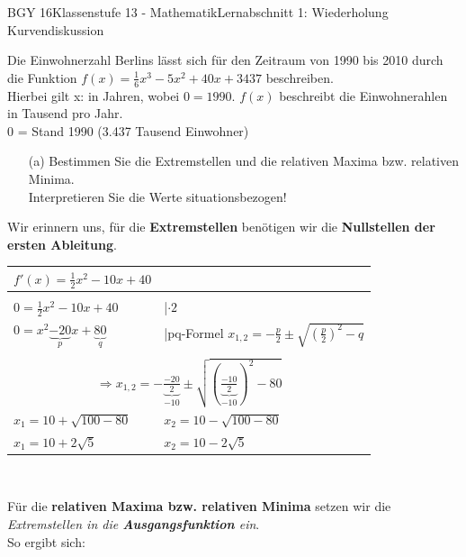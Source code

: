 \documentclass[oneside,openany,headings=optiontotoc,11pt,numbers=noenddot]{scrreprt}
\begin{document}
	\begin{worksheet}{BGY 16}{Klassenstufe 13 - Mathematik}{Lernabschnitt 1: Wiederholung Kurvendiskussion}
		\noindent
		\begin{framed}
			\noindent
			Die Einwohnerzahl Berlins lässt sich für den Zeitraum von 1990 bis 2010 durch die Funktion \(f(x) = \frac{1}{6}x^3 - 5x^2 +40x +3437\) beschreiben.\\
			Hierbei gilt x: in Jahren, wobei \(0 = 1990\). \(f(x)\) beschreibt die Einwohnerahlen in Tausend pro Jahr.\\
			0 = Stand 1990 (3.437 Tausend Einwohner)
		\end{framed}
		\begin{itemize}
			\item[(a)] Bestimmen Sie die Extremstellen und die relativen Maxima bzw. relativen Minima.\\
			Interpretieren Sie die Werte situationsbezogen!
		\end{itemize}
		\begin{framed}
			Wir erinnern uns, für die \textbf{Extremstellen} benötigen wir die \textbf{Nullstellen der ersten Ableitung}.\\
			\begin{tabularx}{\textwidth}{Xl}
				\(f'(x) = \frac{1}{2}x^2 -10x +40\)\\
				\hline
				\\
				\(0 = \frac{1}{2}x^2 -10x +40\) & |\(\cdot{}2\)\\
				\(0 = x^2 \underbrace{-20}_{p}x +\underbrace{80}_{q}\) & |pq-Formel \colorbox{green!10}{\(x_{1,2} = -\frac{p}{2}\pm\sqrt{\left(\frac{p}{2}\right)^2 -q}\)}\\\\
				\multicolumn{2}{c}{\(\Rightarrow x_{1,2} = -\underbrace{\frac{-20}{2}}_{-10}\pm\sqrt{\left(\underbrace{\frac{-10}{2}}_{-10}\right)^2 -80}\)}\\
				\(x_1= 10 + \sqrt{100-80} \) & \(x_2= 10 - \sqrt{100-80}\)\\
				\colorbox{green!10}{\(x_1 = 10 + 2\sqrt{5}\)} & \colorbox{green!10}{\(x_2 = 10 - 2\sqrt{5}\)}
			\end{tabularx}\\
			\par\noindent
			Für die \textbf{relativen Maxima bzw. relativen Minima} setzen wir die \textit{Extremstellen in die \textbf{Ausgangsfunktion} ein}.\\
			So ergibt sich:\\
			\begin{tabularx}{\textwidth}{X}

\end{tabularx}
\end{framed}
\end{worksheet}
\end{document}
